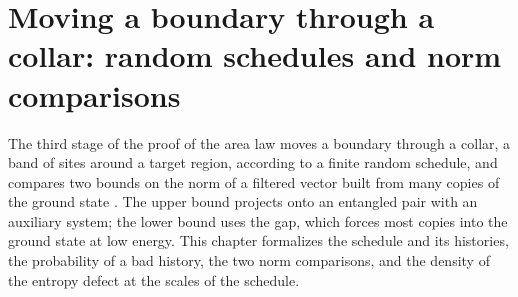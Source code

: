\chapter{Moving a boundary through a collar: random schedules and norm comparisons}
\label{ch:area_law_collar_scan}

The third stage of the proof of the area law moves a boundary through a
collar, a band of sites around a target region, according to a finite random
schedule, and compares two bounds on the norm of a filtered vector built from
many copies of the ground state \cite[Sections~8 and~9]{OpenAI2026AreaLaw}.
The upper bound projects onto an entangled pair with an auxiliary system; the
lower bound uses the gap, which forces most copies into the ground state at low
energy. This chapter formalizes the schedule and its histories, the probability
of a bad history, the two norm comparisons, and the density of the entropy
defect at the scales of the schedule.



















